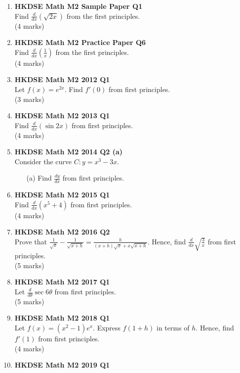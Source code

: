 \documentclass[12pt]{article}
\begin{document}
\begin{enumerate}
	\item \textbf{HKDSE Math M2 Sample Paper Q1}\\
	Find $\displaystyle\frac{d}{dx}(\sqrt{2x})$ from the first principles. \\(4 marks)
	\item \textbf{HKDSE Math M2 Practice Paper Q6}\\
	Find $\displaystyle\frac{d}{dx}\left(\frac{1}{x}\right)$ from the first principles. \\(4 marks)	
	\item \textbf{HKDSE Math M2 2012 Q1}\\
	Let $f(x) = e^{2x}$. Find $f'(0)$ from first principles. \\(3 marks)	
	\item \textbf{HKDSE Math M2 2013 Q1}\\
	Find $\displaystyle\frac{d}{dx} (\sin{2x})$ from first principles. \\(4 marks)	
	\item \textbf{HKDSE Math M2 2014 Q2 (a)}\\
	Consider the curve $C : y = x^3-3x$. 
	\begin{enumerate}
		\item [(a)]Find $\displaystyle\frac{dy}{dx}$ from first principles. 
	\end{enumerate}
	\item \textbf{HKDSE Math M2 2015 Q1}\\
	Find $\displaystyle \frac{d}{dx} (x^5+4)$ from first principles. \\(4 marks)
	\item \textbf{HKDSE Math M2 2016 Q2}\\
	Prove that $\displaystyle\frac{1}{\sqrt{x}} - \frac{1}{\sqrt{x+h}} = \frac{h}{(x+h)\sqrt{x} + x\sqrt{x+h}}$. Hence, find $\displaystyle \frac{d}{dx} \sqrt{\displaystyle\frac{3}{x}}$ from first principles. \\(5 marks)
	\item \textbf{HKDSE Math M2 2017 Q1}\\
	Let $\displaystyle \frac{d}{d\theta} \sec{6\theta}$ from first principles. \\(5 marks)	
	\item \textbf{HKDSE Math M2 2018 Q1}\\
	Let $\displaystyle f(x) = (x^2-1)e^x$.  Express $f(1+h)$ in terms of $h$. Hence, find  $f'(1)$ from first principles. \\(4 marks)	
	\item \textbf{HKDSE Math M2 2019 Q1}\\

\end{enumerate}
\end{document}
